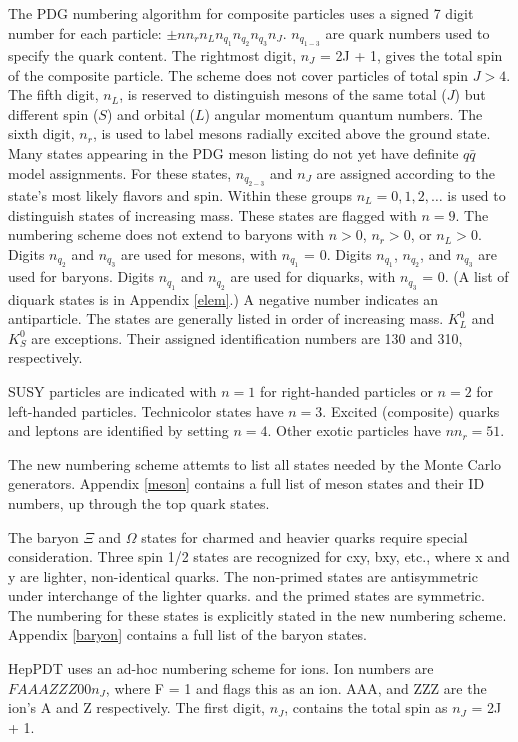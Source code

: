 The PDG numbering algorithm for composite particles uses a signed 7 
digit number for each particle:  $\pm nn_rn_Ln_{q_1}n_{q_2}n_{q_3}n_J$.
$n_{q_{1-3}}$ are quark numbers used to specify the quark content.
The rightmost digit, $n_J$ = 2J + 1, gives the total spin of the composite particle.
The scheme does not cover particles of total spin $J>4$.
The fifth digit, $n_L$, is reserved to distinguish mesons of the
same total ($J$) but different spin ($S$) and orbital ($L$)
angular momentum quantum numbers.
The sixth digit, $n_r$, is used to label mesons radially excited
above the ground state.
Many states appearing in the PDG meson listing do not yet have definite
$q\bar q$ model assignments.  For these states, $n_{q_{2-3}}$
and $n_J$ are assigned according to the state's most likely flavors
and spin.  Within these groups $n_L=0,1,2,\dots$ is used to distinguish
states of increasing mass. These states are flagged with $n=9$.
The numbering scheme does not extend to baryons with $n>0$, $n_r>0$, or $n_L>0$.
Digits $n_{q_2}$ and $n_{q_3}$ are used for mesons, with $n_{q_1}$ = 0.
Digits $n_{q_1}$, $n_{q_2}$, and $n_{q_3}$ are used for baryons.
Digits $n_{q_1}$ and $n_{q_2}$ are used for diquarks, with $n_{q_3}$ = 0. 
(A list of diquark states is in Appendix \ref{elem}.)  
A negative number indicates an antiparticle.  
The states are generally listed in order of increasing mass.  
$K_L^0$ and $K_S^0$ are exceptions.  Their assigned
identification numbers are 130 and 310, respectively.

SUSY particles are indicated with $n=1$ for right-handed particles or $n=2$
for left-handed particles.  Technicolor states have $n=3$.
Excited (composite) quarks and leptons are identified by setting $n=4$.
Other exotic particles have $n n_r=51$.

The new numbering scheme attemts to list all states needed by the
Monte Carlo generators.  Appendix \ref{meson}
contains a full list of meson states and their ID numbers, up through the
top quark states.   

The baryon $\Xi$ and $\Omega$ states for charmed
and heavier quarks require special consideration.  
Three spin 1/2 states are recognized
for cxy, bxy, etc., where x and y are lighter, non-identical quarks.
The non-primed states are antisymmetric under interchange of the lighter quarks.
and the primed states are symmetric.  The numbering for these states is 
explicitly stated in the new numbering scheme.
Appendix \ref{baryon} contains a full list of the baryon states.

HepPDT uses an ad-hoc numbering scheme for ions.  
Ion numbers are $FAAAZZZ00n_J$, where F = 1 and flags this
as an ion.  AAA, and ZZZ are the ion's A and Z respectively.
The first digit, $n_J$, contains the total spin as $n_J$ = 2J + 1.

